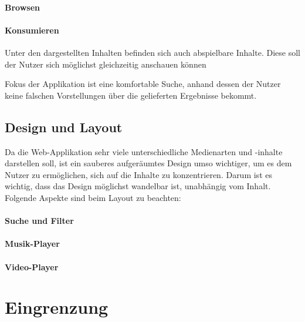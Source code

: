 \paragraph{Browsen}

\paragraph{Konsumieren}
Unter den dargestellten Inhalten befinden sich auch abspielbare Inhalte. Diese soll der Nutzer sich möglichst gleichzeitig anschauen können


Fokus der Applikation ist eine komfortable Suche, anhand dessen der Nutzer keine falschen Vorstellungen über die gelieferten Ergebnisse bekommt. 

\subsection{Design und Layout}
Da die Web-Applikation sehr viele unterschiedliche Medienarten und -inhalte darstellen soll, ist ein sauberes aufgeräumtes Design umso wichtiger, um es dem Nutzer zu ermöglichen, sich auf die Inhalte zu konzentrieren. Darum ist es wichtig, dass das Design möglichst wandelbar ist, unabhängig vom Inhalt. Folgende Aspekte sind beim Layout zu beachten:

\paragraph{Suche und Filter}

\paragraph{Musik-Player}

\paragraph{Video-Player}


\section{Eingrenzung}